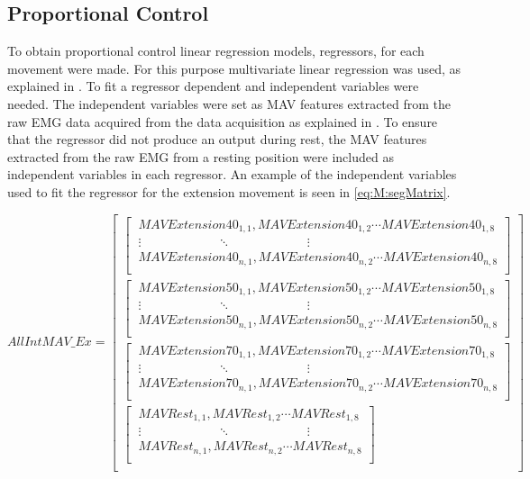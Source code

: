 \subsection{Proportional Control} \label{sub:M:regression}
To obtain proportional control linear regression models, regressors, for each movement were made. For this purpose multivariate linear regression was used, as explained in . To fit a regressor dependent and independent variables were needed. The independent variables were set as MAV features extracted from the raw EMG data acquired from the data acquisition as explained in . To ensure that the regressor did not produce an output during rest, the MAV features extracted from the raw EMG from a resting position were included as independent variables in each regressor. An example of the independent variables used to fit the regressor for the extension movement is seen in \eqref{eq:M:segMatrix}.

\begin{small}
\begin{equation} \label{eq:M:segMatrix}
AllIntMAV\_Ex=\begin{bmatrix}
\begin{bmatrix}
\ MAVExtension40_{1,1}, MAVExtension40_{1,2} \cdots MAVExtension40_{1,8} \\ 
\ \vdots \qquad \qquad \qquad \ddots \qquad \qquad \qquad \vdots \\
\ MAVExtension40_{n,1}, MAVExtension40_{n,2}  \cdots MAVExtension40_{n,8} \\ \end{bmatrix} \\
\begin{bmatrix} 
\ MAVExtension50_{1,1}, MAVExtension50_{1,2} \cdots MAVExtension50_{1,8} \\
\ \vdots \qquad \qquad \qquad \ddots \qquad \qquad \qquad \vdots \\
\ MAVExtension50_{n,1}, MAVExtension50_{n,2} \cdots MAVExtension50_{n,8} \\ \end{bmatrix} \\
\begin{bmatrix} 
\ MAVExtension70_{1,1}, MAVExtension70_{1,2} \cdots MAVExtension70_{1,8} \\
\ \vdots \qquad \qquad \qquad \ddots \qquad \qquad \qquad \vdots \\
\ MAVExtension70_{n,1}, MAVExtension70_{n,2} \cdots MAVExtension70_{n,8} \\ \end{bmatrix} \\
\begin{bmatrix}
\ MAVRest_{1,1}, MAVRest_{1,2} \cdots MAVRest_{1,8} \\ 
\ \vdots \qquad \qquad \qquad \ddots \qquad \qquad \qquad \vdots \\
\ MAVRest_{n,1}, MAVRest_{n,2}  \cdots MAVRest_{n,8} \\ \end{bmatrix} \\
\end{bmatrix}
\end{equation}
\end{small}


